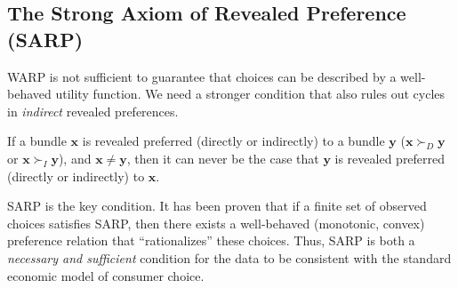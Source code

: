 \subsection{The Strong Axiom of Revealed Preference (SARP)}
WARP is not sufficient to guarantee that choices can be described by a well-behaved utility function. We need a stronger condition that also rules out cycles in \textit{indirect} revealed preferences.

\begin{definition}
    If a bundle \(\mathbf{x}\) is revealed preferred (directly or indirectly) to a bundle \(\mathbf{y}\) (\(\mathbf{x} \succ_D \mathbf{y}\) or \(\mathbf{x} \succ_I \mathbf{y}\)), and \(\mathbf{x} \neq \mathbf{y}\), then it can never be the case that \(\mathbf{y}\) is revealed preferred (directly or indirectly) to \(\mathbf{x}\).
\end{definition}

SARP is the key condition. It has been proven that if a finite set of observed choices satisfies SARP, then there exists a well-behaved (monotonic, convex) preference relation that ``rationalizes'' these choices. Thus, SARP is both a \textit{necessary and sufficient} condition for the data to be consistent with the standard economic model of consumer choice.

